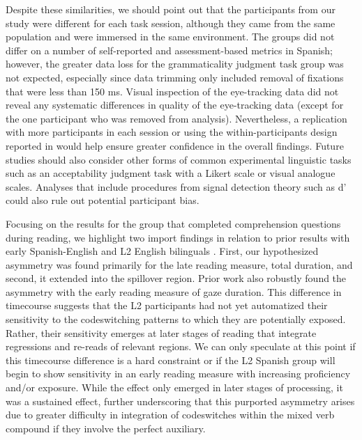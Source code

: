 \documentclass[output=paper,colorlinks,citecolor=brown]{langscibook}
\begin{document}
Despite these similarities, we should point out that the participants from our study were different for each task session, although they came from the same population and were immersed in the same environment. The groups did not differ on a number of self-reported and assessment-based metrics in Spanish; however, the greater data loss for the grammaticality judgment task group was not expected, especially since data trimming only included removal of fixations that were less than 150 ms. Visual inspection of the eye-tracking data did not reveal any systematic differences in quality of the eye-tracking data (except for the one participant who was removed from analysis). Nevertheless, a replication with more participants in each session or using the within-participants design reported in \citet{ValdesKroffetal2018} would help ensure greater confidence in the overall findings. Future studies should also consider other forms of common experimental linguistic tasks such as an acceptability judgment task with a Likert scale or visual analogue scales. Analyses that include procedures from signal detection theory such as d’ could also rule out potential participant bias.

Focusing on the results for the group that completed comprehension questions during reading, we highlight two import findings in relation to prior results with early Spanish-English and L2 English bilinguals \citep{Guzzardo2013,GuzzardoTamargoetal2016}. First, our hypothesized asymmetry was found primarily for the late reading measure, total duration, and second, it extended into the spillover region. Prior work also robustly found the asymmetry with the early reading measure of gaze duration. This difference in timecourse suggests that the L2 participants had not yet automatized their sensitivity to the codeswitching patterns to which they are potentially exposed. Rather, their sensitivity emerges at later stages of reading that integrate regressions and re-reads of relevant regions. We can only speculate at this point if this timecourse difference is a hard constraint or if the L2 Spanish group will begin to show sensitivity in an early reading measure with increasing proficiency and/or exposure. While the effect only emerged in later stages of processing, it was a sustained effect, further underscoring that this purported asymmetry arises due to greater difficulty in integration of codeswitches within the mixed verb compound if they involve the perfect auxiliary.
\end{document}
